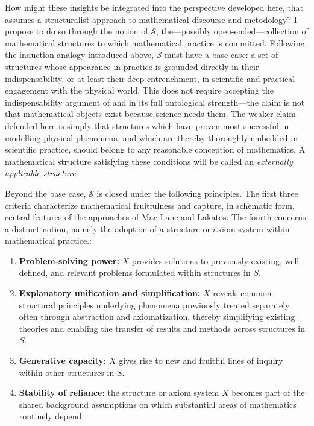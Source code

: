 \documentclass[11pt,a4paper]{book}
\theoremstyle{plain}
\begin{document}
How might these insights be integrated into the perspective developed here, that assumes a structuralist approach to mathematical discourse and metodology? I propose to do so through the notion of $\mathcal{S}$, the---possibly open-ended---collection of mathematical structures to which mathematical practice is committed. Following the induction analogy introduced above, $\mathcal{S}$ must have a base case: a set of structures whose appearance in practice is grounded directly in their indispensability, or at least their deep entrenchment, in scientific and practical engagement with the physical world. This does not require accepting the indispensability argument of \textcite{quine1960} and \textcite{putnam1971} in its full ontological strength---the claim is not that mathematical objects exist because science needs them. The weaker claim defended here is simply that structures which have proven most successful in modelling physical phenomena, and which are thereby thoroughly embedded in scientific practice, should belong to any reasonable conception of mathematics. A mathematical structure satisfying these conditions will be called an \textit{externally applicable structure}.

Beyond the base case, $\mathcal{S}$ is closed under the following principles. The first three criteria characterize mathematical fruitfulness and capture, in schematic form, central features of the approaches of Mac Lane and Lakatos. The fourth concerns a distinct notion, namely the adoption of a structure or axiom system within mathematical practice.:

\begin{enumerate}

    \item \label{condition1} \textbf{Problem-solving power:} $X$ provides solutions to previously existing, well-defined, and relevant problems formulated within structures in $S$.

    \item \label{condition2} \textbf{Explanatory unification and simplification:} $X$ reveals common structural principles underlying phenomena previously treated separately, often through abstraction and axiomatization, thereby simplifying existing theories and enabling the transfer of results and methods across structures in $S$.

    \item \label{condition3} \textbf{Generative capacity:} $X$ gives rise to new and fruitful lines of inquiry within other structures in $S$.
    
    \item \label{condition4} \textbf{Stability of reliance:} the structure or axiom system $X$ becomes part of the shared background assumptions on which substantial areas of mathematics routinely depend.
    
\end{enumerate}
\end{document}

